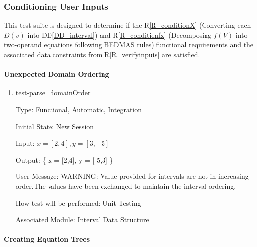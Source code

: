 \documentclass[12pt, titlepage]{article}
\newcommand{\rref}[1]{R\ref{#1}}
\newcommand{\ddref}[1]{DD\ref{#1}}
\begin{document}
\subsubsection{Conditioning User Inputs}
\label{tests_conditioningInputs}
This test suite is designed to determine if the \rref{R_conditionX} (Converting 
each $D(v)$ into \ddref{DD_interval}) and \rref{R_conditionfx} (Decomposing 
$f(V)$ into two-operand equations following BEDMAS rules) functional 
requirements and the associated data constraints from \rref{R_verifyinputs} are 
satisfied.

\paragraph{Unexpected Domain Ordering}

\begin{enumerate}
	
	\item{test-parse\_domainOrder}
	
	Type: Functional, Automatic, Integration
	
	Initial State: New Session
	
	Input: $x = [2,4], y = [3,-5]$
	
	Output:	\{ x = [2,4], y = [-5,3] \}
	
	User Message: WARNING: Value provided for intervals are not in increasing 
	order.The values have been exchanged to maintain the interval ordering.
	
	How test will be performed: Unit Testing
	
	Associated Module: Interval Data Structure\\
	
\end{enumerate}

\paragraph{Creating Equation Trees}
\end{document}
